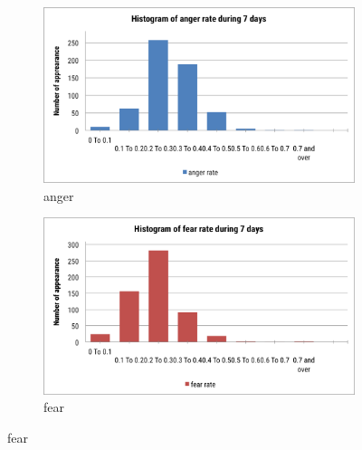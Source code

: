 \begin{figure}[!h] 
\centering    
\begin{subfigure}{0.5\textwidth}
\centering
\includegraphics[width=0.98\linewidth]{HistogramAngerWeek}
\caption{anger}
\label{fig:histogramAngerWeek}
\end{subfigure}%
\begin{subfigure}{0.5\textwidth}
\centering    
\includegraphics[width=0.98\linewidth]{HistogramFearWeek}
\caption{fear}
\label{fig:histogramFearWeek}


\end{subfigure}
\end{figure}
